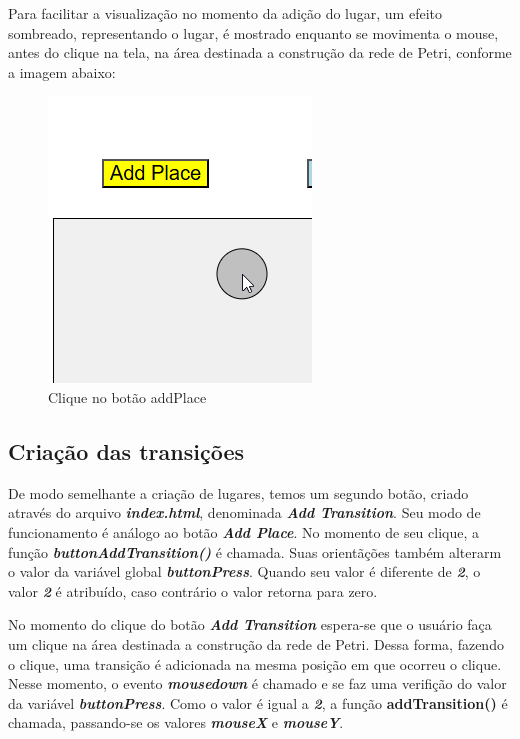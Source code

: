 \documentclass[
	12pt,				%
	openright,			%
	oneside,			%
	a4paper,			%
	english,			%
	brazil				%
	]{abntex2}
\begin{document}
\newpage

Para facilitar a visualização no momento da adição do lugar, um efeito sombreado, representando o lugar, é mostrado enquanto se movimenta o mouse, antes do clique na tela, na área destinada a construção da rede de Petri, conforme a imagem abaixo:

\begin{figure}[ht] 
	\centering
	\includegraphics[scale=0.55]{figuras/exemplo_clique_addPlace.png}
	\caption[Clicando bo botao addPlace]{Clique no botão addPlace}
	\label{fig:clique_add_place}
\end{figure}

\subsection*{Criação das transições}

De modo semelhante a criação de lugares, temos um segundo botão, criado através do arquivo \textbf{\textit{index.html}}, denominada \textbf{\textit{Add Transition}}. Seu modo de funcionamento é análogo ao botão \textbf{\textit{Add Place}}. No momento de seu clique, a função \textbf{\textit{buttonAddTransition()}} é chamada. Suas orientãções também alterarm o valor da variável global \textbf{\textit{buttonPress}}. Quando seu valor é diferente de \textbf{\textit{2}}, o valor \textbf{\textit{2}} é atribuído, caso contrário o valor retorna para zero. 



No momento do clique do botão \textbf{\textit{Add Transition}} espera-se que o usuário faça um clique na área destinada a construção da rede de Petri. Dessa forma, fazendo o clique, uma transição é adicionada na mesma posição em que ocorreu o clique. Nesse momento, o evento \textbf{\textit{mousedown}} é chamado e se faz uma verifição do valor da variável \textbf{\textit{buttonPress}}. Como o valor é igual a \textbf{\textit{2}}, a função \textbf{addTransition()} é chamada, passando-se os valores \textbf{\textit{mouseX}} e \textbf{\textit{mouseY}}.
\end{document}
